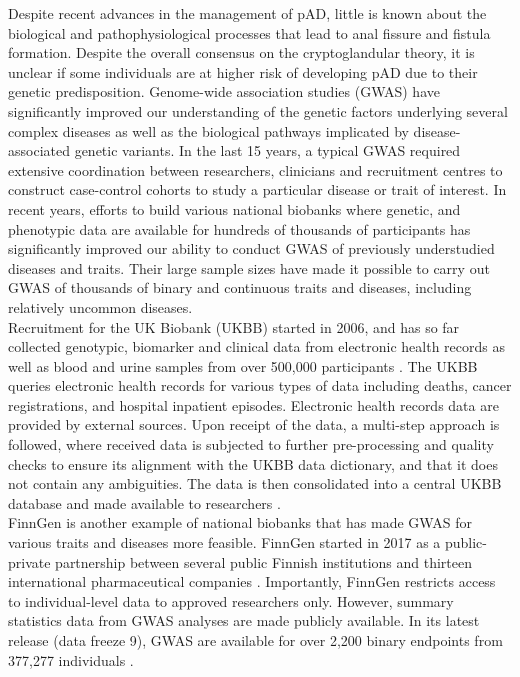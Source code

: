 Despite recent advances in the management of pAD, little is known about the biological and pathophysiological processes that lead to anal fissure and fistula formation. Despite the overall consensus on the cryptoglandular theory, it is unclear if some individuals are at higher risk of developing pAD due to their genetic predisposition. Genome-wide association studies (GWAS) have significantly improved our understanding of the genetic factors underlying several complex diseases as well as the biological pathways implicated by disease-associated genetic variants. In the last 15 years, a typical GWAS required extensive coordination between researchers, clinicians and recruitment centres to construct case-control cohorts to study a particular disease or trait of interest. In recent years, efforts to build various national biobanks where genetic, and phenotypic data are available for hundreds of thousands of participants has significantly improved our ability to conduct GWAS of previously understudied diseases and traits. Their large sample sizes have made it possible to carry out GWAS of thousands of binary and continuous traits and diseases, including relatively uncommon diseases. \\

Recruitment for the UK Biobank (UKBB) started in 2006, and has so far collected genotypic, biomarker and clinical data from electronic health records as well as blood and urine samples from over 500,000 participants \cite{ukbb_showcase}. The UKBB queries electronic health records for various types of data including deaths, cancer registrations, and hospital inpatient episodes. Electronic health records data are provided by external sources. Upon receipt of the data, a multi-step approach is followed, where received data is subjected to further pre-processing and quality checks to ensure its alignment with the UKBB data dictionary, and that it does not contain any ambiguities. The data is then consolidated into a central UKBB database and made available to researchers \cite{ukbb_ehr}.\\

FinnGen is another example of national biobanks that has made GWAS for various traits and diseases more feasible. FinnGen started in 2017 as a public-private partnership between several public Finnish institutions and thirteen international pharmaceutical companies \cite{finngen_forresearchers}. Importantly, FinnGen restricts access to individual-level data to approved researchers only. However, summary statistics data from GWAS analyses are made publicly available. In its latest release (data freeze 9), GWAS are available for over 2,200 binary endpoints from 377,277 individuals \cite{finngen_aboutdf9}. \\


